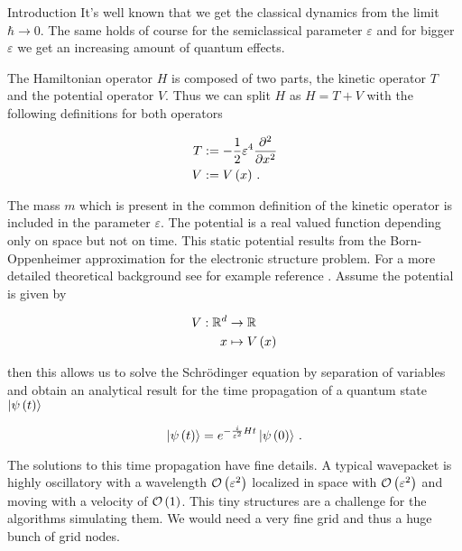 \begin{chapter}{Introduction}
It's well known that we get the classical dynamics from the limit $\hbar \rightarrow 0$.
The same holds of course for the semiclassical parameter $\varepsilon$ and for bigger
$\varepsilon$ we get an increasing amount of quantum effects.

The Hamiltonian operator $H$ is composed of two parts, the kinetic operator $T$
and the potential operator $V$. Thus we can split $H$ as $H = T + V$ with the
following definitions for both operators

\begin{equation} \label{eq:basics_def_ops}
\begin{split}
  T & := - \frac{1}{2} \varepsilon^4 \frac{\partial^2}{\partial x^2} \\
  V & := V\left( x \right) \,.
\end{split}
\end{equation}

The mass $m$ which is present in the common definition of the kinetic operator
is included in the parameter $\varepsilon$. The potential is a real valued
function depending only on space but not on time. This static potential results
from the Born-Oppenheimer approximation for the electronic structure problem.
For a more detailed theoretical background see for example reference
\cite{S_Teufel}. Assume the potential is given by

\begin{equation} \label{eq:basics_potential_function}
\begin{split}
  V : \mathbb{R}^d & \rightarrow \mathbb{R} \\
                 x & \mapsto V\left( x \right)
\end{split}
\end{equation}

then this allows us to solve the Schrödinger equation by separation of variables
and obtain an analytical result for the time propagation of a quantum state $\Ket{\psi\left( t \right)}$

\begin{equation} \label{eq:basics_analytic_time_propagation}
  \Ket{\psi\left( t \right)} = e^{- \frac{i}{\varepsilon^2} H t } \Ket{\psi\left( 0 \right)} \,.
\end{equation}

The solutions to this time propagation have fine details. A typical wavepacket
is highly oscillatory with a wavelength $\mathcal{O}\left( \varepsilon^2 \right)$ localized in space
with $\mathcal{O}\left( \varepsilon^2 \right)$ and moving with a velocity of $\mathcal{O}\left( 1 \right)$. This tiny
structures are a challenge for the algorithms simulating them. We would need a very
fine grid and thus a huge bunch of grid nodes.



\end{chapter}
